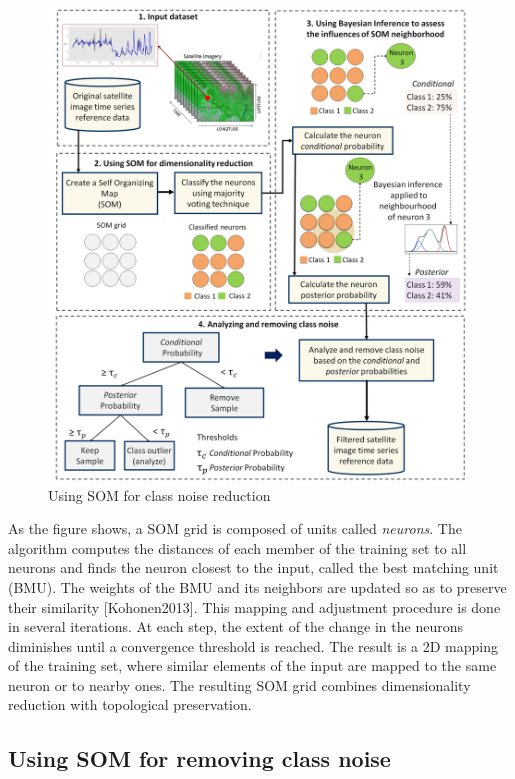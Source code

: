 \documentclass[a4paper,]{tufte-book}
\begin{document}
\begin{figure}

{\centering \includegraphics[width=0.9\linewidth,height=0.9\textheight]{images/methodology_bayes_som} 

}

\caption[Using SOM for class noise reduction]{Using SOM for class noise reduction}\label{fig:unnamed-chunk-37}
\end{figure}

As the figure shows, a SOM grid is composed of units called \emph{neurons}. The algorithm computes the distances of each member of the training set to all neurons and finds the neuron closest to the input, called the best matching unit (BMU). The weights of the BMU and its neighbors are updated so as to preserve their similarity {[}Kohonen2013{]}. This mapping and adjustment procedure is done in several iterations. At each step, the extent of the change in the neurons diminishes until a convergence threshold is reached. The result is a 2D mapping of the training set, where similar elements of the input are mapped to the same neuron or to nearby ones. The resulting SOM grid combines dimensionality reduction with topological preservation.

\hypertarget{using-som-for-removing-class-noise}{%
\subsection{Using SOM for removing class noise}\label{using-som-for-removing-class-noise}}
\end{document}
